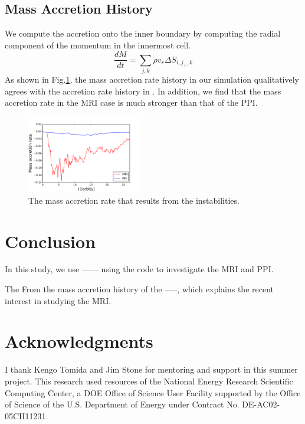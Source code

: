 \documentclass[iop,revtex4]{emulateapj}
\begin{document}
\subsection{Mass Accretion History}
We compute the accretion onto the inner boundary by computing the radial component of the momentum in the innermost cell.
\begin{equation}
\frac{dM}{dt}=\sum_{j,k} \rho v_r \Delta S_{i,j_{\pm},k}
\end{equation}
As shown in Fig.\ref{mass_accretion}, the mass accretion rate history in our simulation qualitatively agrees with the accretion rate history in \cite{Jiang:2014A}. In addition, we find that the mass accretion rate in the \ac{MRI} case is much stronger than that of the \ac{PPI}.
\begin{figure}[h]
\includegraphics[width=0.45\textwidth]{plots/mass_accretion.pdf}
\caption{The mass accretion rate that results from the instabilities.}
\label{mass_accretion}
\end{figure}
\section{Conclusion}
\par In this study, we use ------ using the \app code to investigate the \acf{MRI} and \acf{PPI}.

\par The 
From the mass accretion history of the -----, which explains the recent interest in studying the \ac{MRI}.
\acknowledgments
\section*{Acknowledgments}
I thank Kengo Tomida and Jim Stone for mentoring and support in this summer project. This research used resources of the National Energy Research Scientific Computing Center, a DOE Office of Science User Facility supported by the Office of Science of the U.S. Department of Energy under Contract No. DE-AC02-05CH11231.

\end{document}
